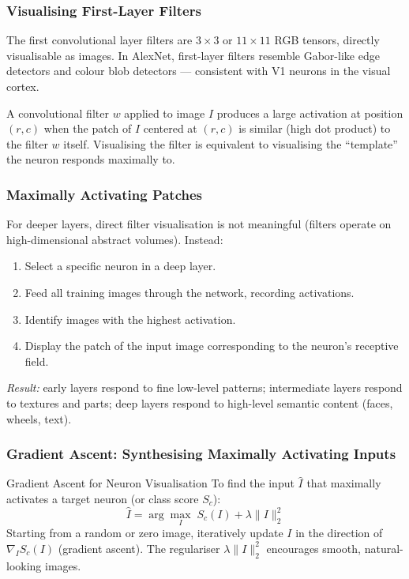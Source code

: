 \documentclass[11pt,a4paper]{article}
\begin{document}
\subsubsection{Visualising First-Layer Filters}

The first convolutional layer filters are $3\times3$ or $11\times11$ RGB tensors, directly visualisable as images. In AlexNet, first-layer filters resemble Gabor-like edge detectors and colour blob detectors — consistent with V1 neurons in the visual cortex.

\begin{insightbox}
A convolutional filter $w$ applied to image $I$ produces a large activation at position $(r,c)$ when the patch of $I$ centered at $(r,c)$ is similar (high dot product) to the filter $w$ itself. Visualising the filter is equivalent to visualising the ``template'' the neuron responds maximally to.
\end{insightbox}

\subsubsection{Maximally Activating Patches}

For deeper layers, direct filter visualisation is not meaningful (filters operate on high-dimensional abstract volumes). Instead:
\begin{enumerate}
  \item Select a specific neuron in a deep layer.
  \item Feed all training images through the network, recording activations.
  \item Identify images with the highest activation.
  \item Display the patch of the input image corresponding to the neuron's receptive field.
\end{enumerate}
\textit{Result:} early layers respond to fine low-level patterns; intermediate layers respond to textures and parts; deep layers respond to high-level semantic content (faces, wheels, text).

\subsubsection{Gradient Ascent: Synthesising Maximally Activating Inputs}

\begin{defbox}{Gradient Ascent for Neuron Visualisation}
To find the input $\hat{I}$ that maximally activates a target neuron (or class score $S_c$):
\[
\hat{I} = \arg\max_{I}\; S_c(I) + \lambda \|I\|_2^2
\]
Starting from a random or zero image, iteratively update $I$ in the direction of $\nabla_I S_c(I)$ (gradient ascent). The regulariser $\lambda\|I\|_2^2$ encourages smooth, natural-looking images.
\end{defbox}
\end{document}
